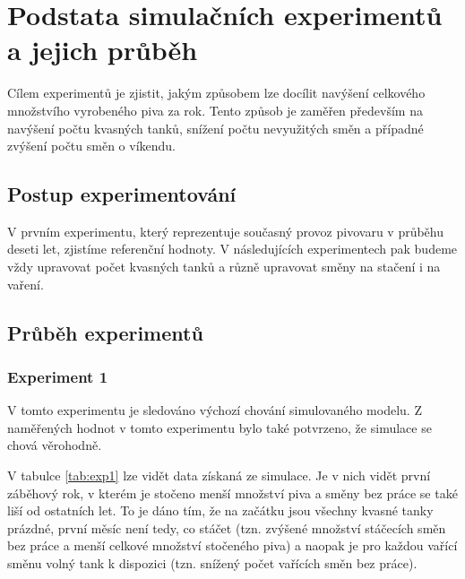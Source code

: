 \documentclass[11pt,a4paper]{article}
\begin{document}
\section{Podstata simulačních experimentů a jejich průběh}
Cílem experimentů je zjistit, jakým způsobem lze docílit navýšení celkového množstvího vyrobeného piva za rok. Tento způsob je zaměřen především na navýšení počtu kvasných tanků, snížení počtu nevyužitých směn a případné zvýšení počtu směn o víkendu.

\subsection{Postup experimentování}
V prvním experimentu, který reprezentuje současný provoz pivovaru v průběhu deseti let, zjistíme referenční hodnoty. V následujících experimentech pak budeme vždy upravovat počet kvasných tanků a různě upravovat směny na stačení i na vaření.

\subsection{Průběh experimentů}
\subsubsection{Experiment 1}
V tomto experimentu je sledováno výchozí chování simulovaného modelu. Z naměřených hodnot v tomto experimentu bylo také potvrzeno, že simulace se chová věrohodně.

V tabulce \ref{tab:exp1} lze vidět data získaná ze simulace. Je v nich vidět první záběhový rok, v kterém je stočeno menší množství piva a směny bez práce se také liší od ostatních let. To je dáno tím, že na začátku jsou všechny kvasné tanky prázdné, první měsíc není tedy, co stáčet (tzn. zvýšené množství stáčecích směn bez práce a menší celkové množství stočeného piva) a naopak je pro každou vařící směnu volný tank k dispozici (tzn. snížený počet vařících směn bez práce).
\end{document}
